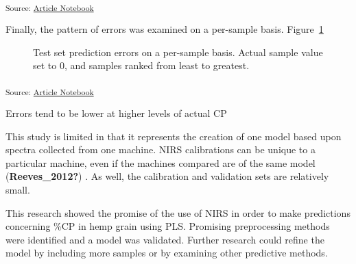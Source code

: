 \documentclass[
]{agujournal2019}
\begin{document}
\textsubscript{Source:
\href{https://rvcrawford.github.io/glowing-system/index.qmd.html}{Article
Notebook}}

Finally, the pattern of errors was examined on a per-sample basis.
Figure~\ref{fig-validation_set_performance}

\label{cell-fig-validation_set_performance}
\begin{figure}[H]


\caption{\label{fig-validation_set_performance}Test set prediction
errors on a per-sample basis. Actual sample value set to 0, and samples
ranked from least to greatest.}

\end{figure}%

\textsubscript{Source:
\href{https://rvcrawford.github.io/glowing-system/index.qmd.html}{Article
Notebook}}

Errors tend to be lower at higher levels of actual CP

This study is limited in that it represents the creation of one model
based upon spectra collected from one machine. NIRS calibrations can be
unique to a particular machine, even if the machines compared are of the
same model (\textbf{Reeves\_2012?}) . As well, the calibration and
validation sets are relatively small.

This research showed the promise of the use of NIRS in order to make
predictions concerning \%CP in hemp grain using PLS. Promising
preprocessing methods were identified and a model was validated. Further
research could refine the model by including more samples or by
examining other predictive methods.
\end{document}
